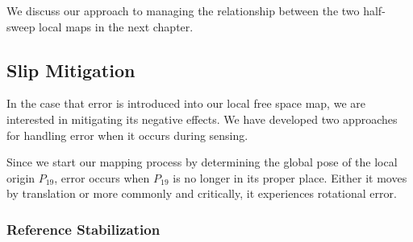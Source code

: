 We discuss our approach to managing the relationship between the two half-sweep local maps in the next chapter.







\subsection{Slip Mitigation}
\label{slipmitigation}

In the case that error is introduced into our local free space map, we are interested in mitigating its negative effects. We have developed two approaches for handling error when it occurs during sensing.

Since we start our mapping process by determining the global pose of the local origin $P_{19}$, error occurs when $P_{19}$ is no longer in its proper place. Either it moves by translation or more commonly and critically, it experiences rotational error. 

\subsubsection{Reference Stabilization}
\label{sec:ref_stable}

